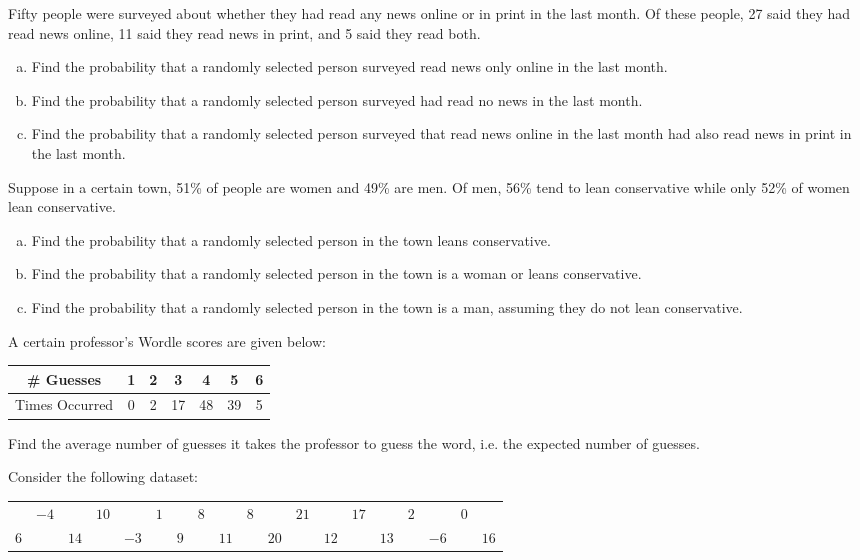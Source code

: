 \documentclass[12pt,letterpaper]{exam}
\begin{document}
\begin{questions}
\newpage
\question[10] Fifty people were surveyed about whether they had read any news online or in print in the last month. Of these people, 27 said they had read news online, 11 said they read news in print, and 5 said they read both. 
	\begin{enumerate}[(a)]
	\item Find the probability that a randomly selected person surveyed read news only online in the last month. 
	\item Find the probability that a randomly selected person surveyed had read no news in the last month. 
	\item Find the probability that a randomly selected person surveyed that read news online in the last month had also read news in print in the last month. 
	\end{enumerate}



\newpage
\question[10] Suppose in a certain town, 51\% of people are women and 49\% are men. Of men, 56\% tend to lean conservative while only 52\% of women lean conservative. 
	\begin{enumerate}[(a)]
	\item Find the probability that a randomly selected person in the town leans conservative. 
	\item Find the probability that a randomly selected person in the town is a woman or leans conservative. 
	\item Find the probability that a randomly selected person in the town is a man, assuming they do not lean conservative. 
	\end{enumerate}



\newpage
\question[10] A certain professor's Wordle scores are given below: \par
	\begin{table}[h]
	\centering
	\begin{tabular}{c||cccccc}
	\# Guesses & 1 & 2 & 3 & 4 & 5 & 6 \\ \hline
	Times Occurred & 0 & 2 & 17 & 48 & 39 & 5 
	\end{tabular}
	\end{table} \par
Find the average number of guesses it takes the professor to guess the word, i.e. the expected number of guesses. 



\newpage
\question[10] Consider the following dataset: \par
	\begin{table}[h]
	\centering
	\begin{tabular}{rrrrrrrrrrrrrrrrrrr}
	& $-4$ && $10$ && $1$ && $8$ && $8$ && $21$ && $17$ && $2$ && $0$ \\ 
	$6$ && $14$ && $-3$ && $9$ && $11$ && $20$ && $12$ && $13$ && $-6$ && $16$
	\end{tabular}
	\end{table} \par


\end{questions}
\end{document}
